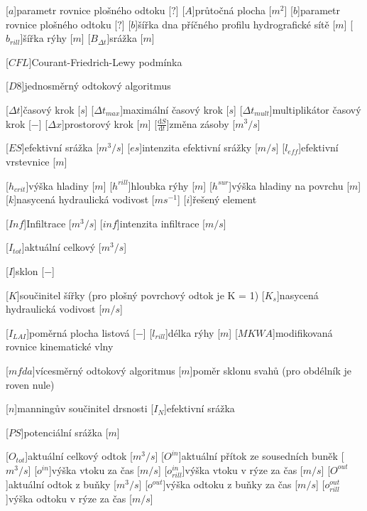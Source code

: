 \begin{acronym}
\setlength{\parskip}{0ex}
\setlength{\itemsep}{1ex}

[$a$]{parametr rovnice plošného odtoku [$?$]}
[$A$]{průtočná plocha  [$m^{2}$]}
[$b$]{parametr rovnice plošného odtoku [$?$]}
[$b$]{šířka dna příčného profilu hydrografické sítě [$m$]}
[$b_{rill}$]{šířka rýhy [$m$]}
[$B_{\Delta t}$]{srážka [$m$]}

[$CFL$]{Courant-Friedrich-Lewy podmínka}


[$D8$]{jednosměrný odtokový algoritmus}

[$\Delta t$]{časový krok [$s$]}
[$\Delta t_{max}$]{maximální časový krok [$s$]}
[$\Delta t_{mult}$]{multiplikátor časový krok [$-$]}
[$\Delta x$]{prostorový krok [$m$]}
[$\frac{\mathrm{d}S}{\mathrm{d}t}$]{změna zásoby [$m^3/s$]}

[$ES$]{efektivní srážka [$m^3/s$]}
[$es$]{intenzita efektivní srážky [$m/s$]}
[$l_{eff}$]{efektivní vrstevnice [$m$]}

[$h_{crit}$]{výška hladiny [$m$]}
[$h^{rill}$]{hloubka rýhy [$m$]}
[$h^{sur}$]{výška hladiny na povrchu [$m$]}
[$k$]{nasycená hydraulická vodivost [$m s^{-1}$]}
[$i$]{řešený element}

[$Inf$]{Infiltrace [$m^3/s$]}
[$inf$]{intenzita infiltrace [$m/s$]}

[$I_{tot}$]{aktuální celkový [$m^3/s$]}

[$I$]{sklon [$-$]}

[$K$]{součinitel šířky (pro plošný povrchový odtok je K = 1)}
[$K_s$]{nasycená hydraulická vodivost [$m/s$]}

[$I_{LAI}$]{poměrná plocha listová [$-$]}
[$l_{rill}$]{délka rýhy [$m$]}
[$MKWA$]{modifikovaná rovnice kinematické vlny}

[$mfda$]{vícesměrný odtokový algoritmus}
[$m$]{poměr sklonu svahů (pro obdélník je roven nule)}

[$n$]{manningův součinitel drsnosti}
[$I_{N}$]{efektivní srážka}

[$PS$]{potenciální srážka [$m$]}

[$O_{tot}$]{aktuální celkový odtok [$m^{3}/s$]}
[$O^{in}$]{aktuální přítok ze sousedních buněk [$m^{3}/s$]}
[$o^{in}$]{výška vtoku za čas [$m/s$]}
[$o^{in}_{rill}$]{výška vtoku v rýze za čas [$m/s$]}
[$O^{out}$]{aktuální odtok z buňky [$m^{3}/s$]}
[$o^{out}$]{výška odtoku z buňky  za čas [$m/s$]}
[$o^{out}_{rill}$]{výška odtoku v rýze za čas [$m/s$]}



\end{acronym}
